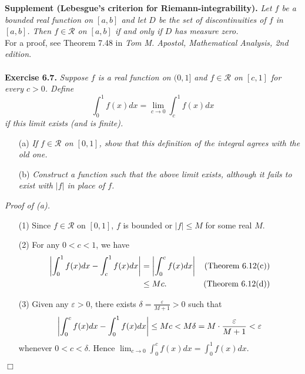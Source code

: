 \documentclass{article}
\begin{document}
\textbf{Supplement (Lebesgue's criterion for Riemann-integrability).}
\emph{Let $f$ be a bounded real function on $[a,b]$
and let $D$ be the set of discontinuities of $f$ in $[a,b]$.
Then $f \in \mathscr{R}$ on $[a,b]$ if and only if $D$ has measure zero.} \\

For a proof,
see Theorem 7.48 in \emph{Tom M. Apostol, Mathematical Analysis, 2nd edition}. \\\\






\textbf{Exercise 6.7.}
\emph{Suppose $f$ is a real function on $(0,1]$ and $f \in \mathscr{R}$ on $[c,1]$
for every $c > 0$.
Define
\[
  \int_{0}^{1}f(x)dx = \lim_{c \to 0} \int_{c}^{1}f(x)dx
\]
if this limit exists (and is finite).}
\begin{enumerate}
  \item[(a)]
  \emph{If $f \in \mathscr{R}$ on $[0,1]$,
  show that this definition of the integral agrees with the old one.}

  \item[(b)]
  \emph{Construct a function such that the above limit exists,
  although it fails to exist with $|f|$ in place of $f$.} \\
\end{enumerate}

\emph{Proof of (a).}
\begin{enumerate}
\item[(1)]
  Since $f \in \mathscr{R}$ on $[0,1]$, $f$ is bounded or
  $|f| \leq M$ for some real $M$.

\item[(2)]
For any $0 < c < 1$,
we have
\begin{align*}
  \abs{ \int_{0}^{1} f(x)dx - \int_{c}^{1} f(x)dx }
  &= \abs{ \int_{0}^{c} f(x)dx }
    &\text{(Theorem 6.12(c))}\\
  &\leq Mc.
    &\text{(Theorem 6.12(d))}
\end{align*}

\item[(3)]
Given any $\varepsilon > 0$, there exists $\delta = \frac{\varepsilon}{M+1} > 0$
such that
\[
  \abs{ \int_{0}^{c} f(x)dx - \int_{0}^{1} f(x)dx }
  \leq Mc
  < M \delta
  = M \cdot \frac{\varepsilon}{M+1}
  < \varepsilon
\]
whenever $0 < c < \delta$.
Hence $\lim_{c \to 0} \int_{0}^{c} f(x)dx = \int_{0}^{1} f(x)dx$.
\end{enumerate}
$\Box$ \\
\end{document}

